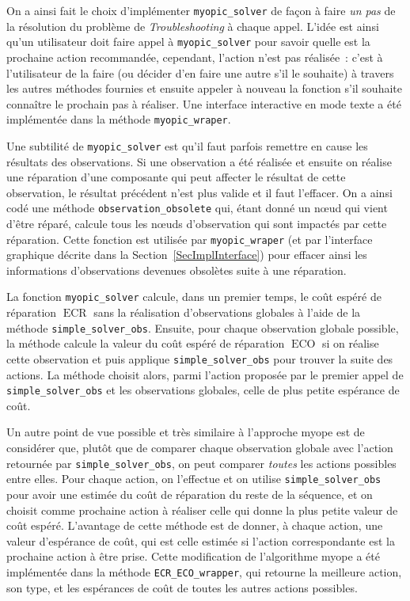 \documentclass[a4paper,11pt]{article}
\theoremstyle{plain}
\theoremstyle{definition}
\DeclareMathOperator{\ECO}{ECO}
\DeclareMathOperator{\ECR}{ECR}
\begin{document}
On a ainsi fait le choix d'implémenter \texttt{myopic\_solver} de façon à faire \emph{un pas} de la résolution du problème de \emph{Troubleshooting} à chaque appel. L'idée est ainsi qu'un utilisateur doit faire appel à \texttt{myopic\_solver} pour savoir quelle est la prochaine action recommandée, cependant, l'action n'est pas réalisée~: c'est à l'utilisateur de la faire (ou décider d'en faire une autre s'il le souhaite) à travers les autres méthodes fournies et ensuite appeler à nouveau la fonction s'il souhaite connaître le prochain pas à réaliser. Une interface interactive en mode texte a été implémentée dans la méthode \texttt{myopic\_wraper}.

Une subtilité de \texttt{myopic\_solver} est qu'il faut parfois remettre en cause les résultats des observations. Si une observation a été réalisée et ensuite on réalise une réparation d'une composante qui peut affecter le résultat de cette observation, le résultat précédent n'est plus valide et il faut l'effacer. On a ainsi codé une méthode \texttt{observation\_obsolete} qui, étant donné un nœud qui vient d'être réparé, calcule tous les nœuds d'observation qui sont impactés par cette réparation. Cette fonction est utilisée par \texttt{myopic\_wraper} (et par l'interface graphique décrite dans la Section~\ref{SecImplInterface}) pour effacer ainsi les informations d'observations devenues obsolètes suite à une réparation.

La fonction \texttt{myopic\_solver} calcule, dans un premier temps, le coût espéré de réparation $\ECR$ sans la réalisation d'observations globales à l'aide de la méthode \texttt{simple\_solver\_obs}. Ensuite, pour chaque observation globale possible, la méthode calcule la valeur du coût espéré de réparation $\ECO$ si on réalise cette observation et puis applique \texttt{simple\_solver\_obs} pour trouver la suite des actions. La méthode choisit alors, parmi l'action proposée par le premier appel de \texttt{simple\_solver\_obs} et les observations globales, celle de plus petite espérance de coût.

Un autre point de vue possible et très similaire à l'approche myope est de considérer que, plutôt que de comparer chaque observation globale avec l'action retournée par \texttt{simple\_solver\_obs}, on peut comparer \emph{toutes} les actions possibles entre elles. Pour chaque action, on l'effectue et on utilise \texttt{simple\_solver\_obs} pour avoir une estimée du coût de réparation du reste de la séquence, et on choisit comme prochaine action à réaliser celle qui donne la plus petite valeur de coût espéré. L'avantage de cette méthode est de donner, à chaque action, une valeur d'espérance de coût, qui est celle estimée si l'action correspondante est la prochaine action à être prise. Cette modification de l'algorithme myope a été implémentée dans la méthode \texttt{ECR\_ECO\_wrapper}, qui retourne la meilleure action, son type, et les espérances de coût de toutes les autres actions possibles.
\end{document}
